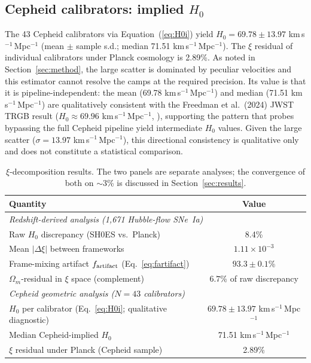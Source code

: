 \documentclass[usenatbib]{mnras}
\begin{document}
\subsection{Cepheid calibrators: implied $H_0$}

The 43 Cepheid calibrators via Equation~(\ref{eq:H0i}) yield
$H_0 = 69.78 \pm 13.97$ km\,s$^{-1}$\,Mpc$^{-1}$ (mean $\pm$ sample s.d.;
median 71.51 km\,s$^{-1}$\,Mpc$^{-1}$).
The $\xi$ residual of individual calibrators under Planck cosmology is 2.89\%.
As noted in Section~\ref{sec:method}, the large scatter is dominated by
peculiar velocities and this estimator cannot resolve the camps at the
required precision. Its value is that it is pipeline-independent: the mean
(69.78 km\,s$^{-1}$\,Mpc$^{-1}$) and median (71.51 km\,s$^{-1}$\,Mpc$^{-1}$)
are qualitatively consistent with the Freedman et al.\ (2024) JWST TRGB result
($H_0 \approx 69.96$ km\,s$^{-1}$\,Mpc$^{-1}$, \citealt{freedman2024}),
supporting the pattern that probes bypassing the full Cepheid
pipeline yield intermediate $H_0$ values. Given the large scatter
($\sigma = 13.97$ km\,s$^{-1}$\,Mpc$^{-1}$), this directional
consistency is qualitative only and does not constitute a statistical
comparison.

\begin{table}
\centering
\caption{$\xi$-decomposition results. The two panels are separate analyses;
the convergence of both on $\sim$3\% is discussed in Section~\ref{sec:results}.}
\label{tab:results}
\begin{tabular}{lc}
\toprule
Quantity & Value \\
\midrule
\multicolumn{2}{l}{\textit{Redshift-derived analysis (1,671 Hubble-flow SNe~Ia)}} \\
Raw $H_0$ discrepancy (SH0ES vs.\ Planck) & 8.4\% \\
Mean $|\Delta\xi|$ between frameworks & $1.11\times10^{-3}$ \\
Frame-mixing artifact $f_{\rm artifact}$ (Eq.~\ref{eq:fartifact}) & $93.3 \pm 0.1$\% \\
$\Omega_m$-residual in $\xi$ space (complement) & $6.7$\% of raw discrepancy \\[4pt]
\multicolumn{2}{l}{\textit{Cepheid geometric analysis ($N=43$ calibrators)}} \\
$H_0$ per calibrator (Eq.~\ref{eq:H0i}; qualitative diagnostic) & $69.78 \pm 13.97$ km\,s$^{-1}$\,Mpc$^{-1}$ \\
Median Cepheid-implied $H_0$ & 71.51 km\,s$^{-1}$\,Mpc$^{-1}$ \\
$\xi$ residual under Planck (Cepheid sample) & 2.89\% \\
\bottomrule
\end{tabular}
\end{table}
\end{document}
